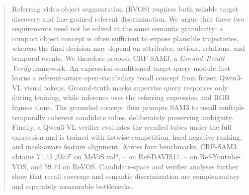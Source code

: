\begin{abstract}
Referring video object segmentation (RVOS) requires both reliable target discovery and fine-grained referent discrimination. We argue that these two requirements need not be solved at the same semantic granularity: a compact object concept is often sufficient to expose plausible trajectories, whereas the final decision may depend on attributes, actions, relations, and temporal events. We therefore propose CRF-SAM3, a \emph{Ground--Recall--Verify} framework. An expression-conditioned target-query module first learns a referent-aware open-vocabulary recall concept from frozen Qwen3-VL visual tokens. Ground-truth masks supervise query responses only during training, while inference uses the referring expression and RGB frames alone. The grounded concept then prompts SAM3 to recall multiple temporally coherent candidate tubes, deliberately preserving ambiguity. Finally, a Qwen3-VL verifier evaluates the recalled tubes under the full expression and is trained with listwise competition, hard-negative ranking, and mask-aware feature alignment. Across four benchmarks, CRF-SAM3 obtains 71.45 $\mathcal{J}\&\mathcal{F}$ on MeViS val$^u$, -- on Ref-DAVIS17, -- on Ref-Youtube-VOS, and 59.74 on ReVOS. Candidate-space and verifier analyses further show that recall coverage and semantic discrimination are complementary and separately measurable bottlenecks.
\end{abstract}
